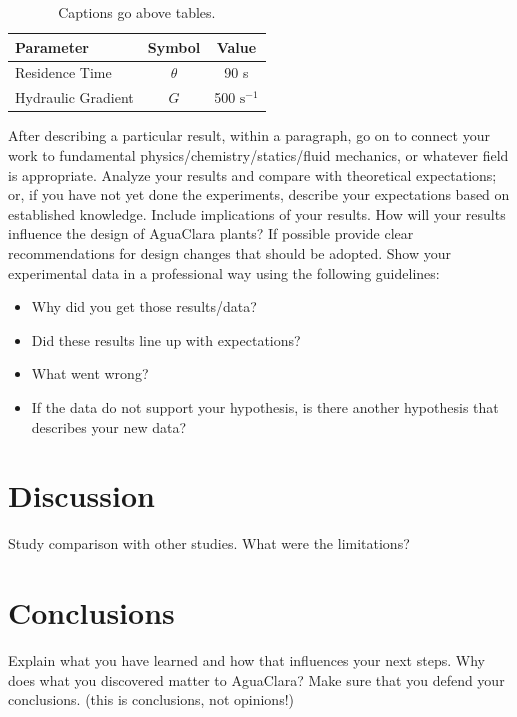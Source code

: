 \documentclass[a4paper]{article}
\begin{document}
\begin{table}[H]
	\centering
	\caption{Captions go above tables.}
	\begin{tabular}{| l | c | c |}
		\hline
		Parameter          & Symbol   & Value                 \\ \hline
		Residence Time     & $\theta$ & 90 s                  \\ \hline
		Hydraulic Gradient & $G$      & 500 $\mathrm{s^{-1}}$ \\
		\hline
	\end{tabular}
	\label{Table}
\end{table}

After describing a particular result, within a paragraph, go on to connect your work to fundamental physics/chemistry/statics/fluid mechanics, or whatever field is appropriate. Analyze your results and compare with theoretical expectations; or, if you have not yet done the experiments, describe your expectations based on established knowledge. Include implications of your results. How will your results influence the design of AguaClara plants? If possible provide clear recommendations for design changes that should be adopted. Show your experimental data in a professional way using the following guidelines:
\begin{itemize}
	\item Why did you get those results/data?
	\item Did these results line up with expectations?
	\item What went wrong?
	\item If the data do not support your hypothesis, is there another hypothesis that describes your new data?
\end{itemize}

\section*{Discussion}
Study comparison with other studies. What were the limitations?

\section*{Conclusions}
Explain what you have learned and how that influences your next steps. Why does what you discovered matter to AguaClara?
Make sure that you defend your conclusions. (this is conclusions, not opinions!)
\end{document}
